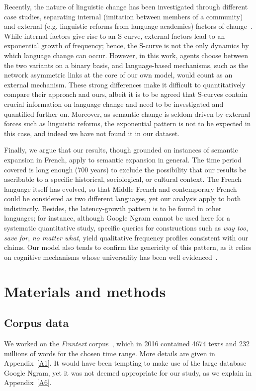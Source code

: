 \documentclass[12pt,twocolumn,amsmath,amssymb,aps,longbibliography]{revtex4-1}  %
\newcommand{\tit}{\textit}
\begin{document}
Recently, the nature of linguistic change has been investigated through different case studies, separating internal (imitation between members of a community) and external  (e.g. linguistic reforms from language academies) factors of change~\cite{ghanbarnejad2014extracting}. While internal factors give rise to an S-curve, external factors lead to an exponential growth of frequency; hence, the S-curve is not the only dynamics by which language change can occur.  However, in this work, agents choose between the two variants on a binary basis, and language-based mechanisms, such as the network asymmetric links at the core of our own model, would count as an external mechanism. These strong differences make it difficult to quantitatively compare their approach and ours, albeit it is to be agreed that S-curves contain crucial information on language change and need to be investigated and quantified further on. Moreover, as semantic change is seldom driven by external forces such as linguistic reforms, the exponential pattern is not to be expected in this case, and indeed we have not found it in our dataset. 

Finally, we argue that our results, though grounded on instances of semantic expansion in French, apply to semantic expansion in general. The time period covered is long enough (700 years) to exclude the possibility that our results be ascribable to a specific historical, sociological, or cultural context. The French language itself has evolved, so that Middle French and contemporary French could be considered as two different languages, yet our analysis apply to both indistinctly. Besides, the latency-growth pattern is to be found in other languages; for instance, although Google Ngram cannot be used here for a systematic quantitative study, specific queries for constructions such as \tit{way too}, \tit{save for}, \tit{no matter what}, yield qualitative frequency profiles consistent with our claims. Our model also tends to confirm the genericity of this pattern, as it relies on cognitive mechanisms whose universality has been well evidenced~\cite{heine2002world,lapolla2015logical}. 


\section*{Materials and methods}

\subsection*{Corpus data}
We worked on the \tit{Frantext} corpus~\cite{frantext}, which in 2016 contained 4674 texts and 232 millions of words for the chosen time range. More details are given in Appendix~\ref{A1}. It would have been tempting to make use of the large database Google Ngram, yet it was not deemed appropriate for our study, as we explain in Appendix~\ref{A6}.
\end{document}
